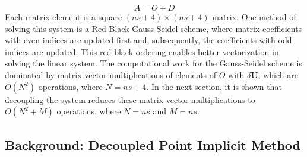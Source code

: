 \begin{equation}
\label{decomp_jac}
	A=O+D
\end{equation}
Each matrix element is a square $(ns+4)\times(ns+4)$ matrix.  One method of
solving this system is a Red-Black Gauss-Seidel scheme\cite{red-black}, where
matrix coefficients with even indices are updated first and, subsequently, the
coefficients with odd indices are updated.  This red-black ordering enables
better vectorization in solving the linear system.  The computational work for
the Gauss-Seidel scheme is dominated by matrix-vector multiplications of
elements of $O$ with $\delta\mathbf{U}$, which are $O(N^2)$ operations, where
$N=ns+4$.  In the next section, it is shown that decoupling the system reduces
these matrix-vector multiplications to $O(N^2 + M)$ operations, where $N=ns$ and
$M=ns$.

\subsection{Background: Decoupled Point Implicit Method}

